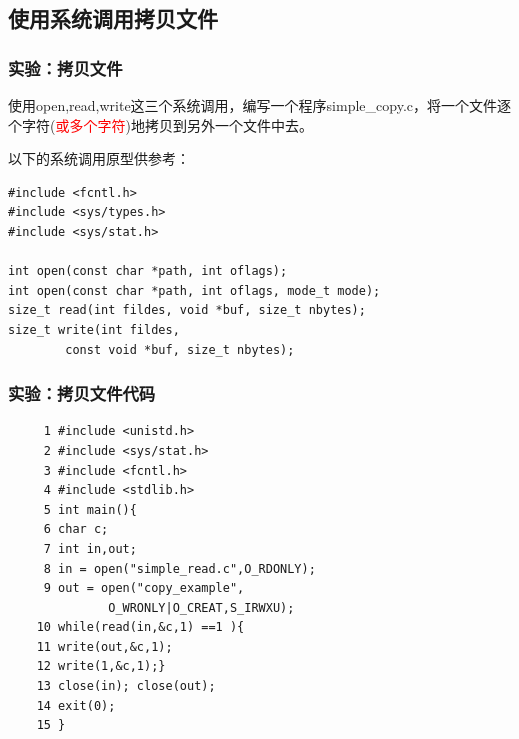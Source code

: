 \documentclass{beamer}
\begin{document}
\subsection{使用系统调用拷贝文件}
\begin{frame}[fragile]
\frametitle{实验：拷贝文件}
使用open,read,write这三个系统调用，编写一个程序simple\_copy.c，将一个文件逐个字符(\textcolor{red}{或多个字符})地拷贝到另外一个文件中去。

以下的系统调用原型供参考：
\begin{lstlisting}
#include <fcntl.h>
#include <sys/types.h>
#include <sys/stat.h>

int open(const char *path, int oflags);
int open(const char *path, int oflags, mode_t mode);
size_t read(int fildes, void *buf, size_t nbytes);
size_t write(int fildes, 
        const void *buf, size_t nbytes);
\end{lstlisting}

\end{frame}
\begin{frame}[fragile]
\frametitle{实验：拷贝文件代码}
\begin{lstlisting}
     1 #include <unistd.h>
     2 #include <sys/stat.h>
     3 #include <fcntl.h>
     4 #include <stdlib.h>
     5 int main(){
     6 char c;
     7 int in,out;
     8 in = open("simple_read.c",O_RDONLY);
     9 out = open("copy_example",
              O_WRONLY|O_CREAT,S_IRWXU);
    10 while(read(in,&c,1) ==1 ){
    11 write(out,&c,1);
    12 write(1,&c,1);}
    13 close(in); close(out);
    14 exit(0);
    15 }
\end{lstlisting}
\end{frame}

\end{document}
